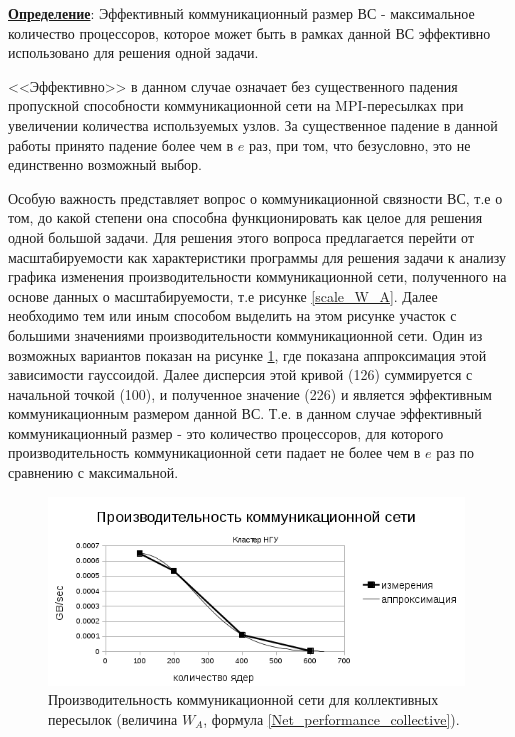  \underline{\textbf{Определение}}: Эффективный коммуникационный размер ВС - максимальное количество процессоров, которое может быть в рамках данной ВС эффективно использовано для решения одной задачи.  
 
 <<Эффективно>> в данном случае означает без существенного падения пропускной способности коммуникационной сети на MPI-пересылках при увеличении количества используемых узлов. За существенное падение в данной работы принято падение более чем в $e$ раз, при том, что безусловно, это не единственно возможный выбор. 
 
 Особую важность представляет вопрос о коммуникационной связности ВС, т.е о том, до какой степени она способна функционировать как целое для решения одной большой задачи. Для решения этого вопроса предлагается перейти от масштабируемости как характеристики программы для решения задачи к анализу графика изменения производительности коммуникационной сети, полученного на основе данных о масштабируемости, т.е рисунке \ref{scale_W_A}. Далее необходимо тем или иным способом выделить на этом рисунке участок с большими значениями производительности коммуникационной сети.
 Один из возможных вариантов показан на рисунке \ref{scale_W_A_exp}, где показана аппроксимация этой зависимости гауссоидой. Далее дисперсия этой кривой (126) суммируется с начальной точкой (100), и полученное значение (226) и является эффективным коммуникационным размером данной ВС. Т.е. в данном случае эффективный коммуникационный размер - это количество процессоров, для которого производительность коммуникационной сети падает не более чем в $e$ раз по сравнению с максимальной.
 
 
 \begin{figure}[h]
 	
 	
 	\begin{center}
 		\includegraphics[height=5cm,keepaspectratio]{images/scaleNSU_exp_fit.png}
 		\caption{
 			Производительность коммуникационной сети для коллективных пересылок (величина $W_A$, формула \ref{Net_performance_collective}). 
 		}
 		\label{scale_W_A_exp}
 	\end{center} 
 \end{figure}
 
